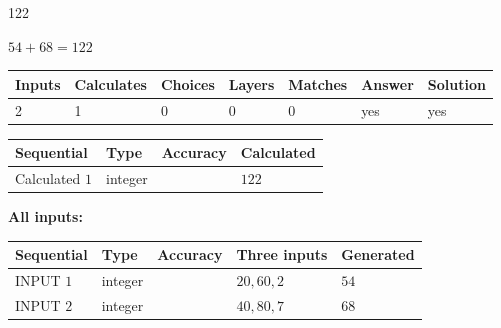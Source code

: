 \documentclass[12pt]{article}
\begin{document}
\noindent{}
 
 

122
 
 
\noindent{}
 
 

 
 
 
\noindent{}
 
 

$ %
54 +  %
68=   %
122$
 
 
\noindent{}
 
 

 
   
   
   
   
\noindent\begin{tabular}{|l|l|l|l|l|l|l|}
 \hline
Inputs & Calculates & Choices & Layers & Matches & Answer & Solution \\ \hline
 2  & 
 1  & 
 0
  & 
 0  & 
 0  & 
  yes & 
  yes 
  \\ \hline
 \end{tabular}
   
   
   
   
\noindent{}
   
   
  
  
\noindent\begin{tabular}{|l|l|l|l|}
\hline
 Sequential & Type & Accuracy & Calculated \\ 
\hline
 
 
  Calculated $  1 $ & integer &  & 
  $ 122 $ 
 \\  \hline  
 \end{tabular}
   
   
   
   
\noindent\vspace{0.1in}\hspace{-0.08in} {\textbf{\Large{All inputs: }}}
   
   
  
  
\noindent\begin{tabular}{|l|l|l|l|l|}
\hline
 Sequential & Type & Accuracy & Three inputs & Generated \\ 
\hline
 
 
  INPUT $  1 $ & integer &  & $
 20
 , 
 60
 , 
 2
 $ & $ 54 $ 
 \\  \hline  
 
 
  INPUT $  2 $ & integer &  & $
 40
 , 
 80
 , 
 7
 $ & $ 68 $ 
 \\  \hline  
 \end{tabular}
   
\end{document}
